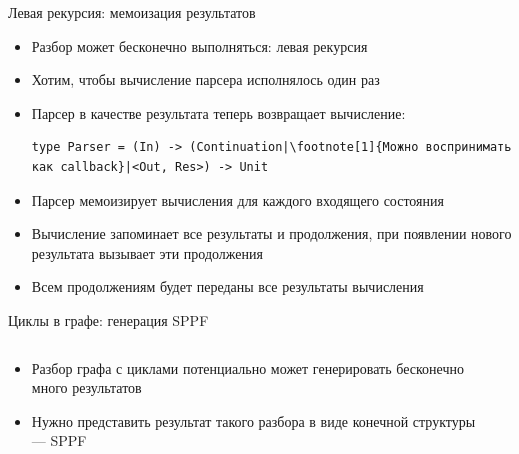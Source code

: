 \documentclass[aspectratio=169]{beamer}
\begin{document}
\begin{frame}[fragile]{Левая рекурсия: мемоизация результатов}
  \begin{itemize}
    \item Разбор может бесконечно выполняться: левая рекурсия

    \item Хотим, чтобы вычисление парсера исполнялось один раз

    \item Парсер в качестве результата теперь возвращает вычисление:
          \begin{verbatim}
type Parser = (In) -> (Continuation|\footnote[1]{Можно воспринимать как callback}|<Out, Res>) -> Unit
\end{verbatim}
    \item Парсер мемоизирует вычисления для каждого входящего состояния

    \item Вычисление запоминает все результаты и продолжения, при появлении нового результата вызывает эти продолжения

    \item Всем продолжениям будет переданы все результаты вычисления

  \end{itemize}
\end{frame}


\begin{frame}{Циклы в графе: генерация SPPF}
  \begin{columns}[c]
    \begin{column}{0.55\textwidth}
      \begin{itemize}
        \item Разбор графа с циклами потенциально может генерировать бесконечно много результатов
        \item Нужно представить результат такого разбора в виде конечной структуры --- SPPF
      \end{itemize}

    \end{column}
    \begin{column}{0.55\textwidth}
      \center{}
    \end{column}
  \end{columns}
\end{frame}
\end{document}
